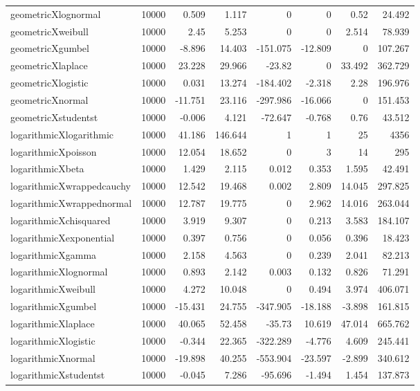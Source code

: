 \begin{table}[!htbp]
{\begin{tabular}{lrrrrrrr}
geometricXlognormal & 10000 & 0.509 & 1.117 & 0 & 0 & 0.52 & 24.492 \\ 
geometricXweibull & 10000 & 2.45 & 5.253 & 0 & 0 & 2.514 & 78.939 \\ 
geometricXgumbel & 10000 & -8.896 & 14.403 & -151.075 & -12.809 & 0 & 107.267 \\ 
geometricXlaplace & 10000 & 23.228 & 29.966 & -23.82 & 0 & 33.492 & 362.729 \\ 
geometricXlogistic & 10000 & 0.031 & 13.274 & -184.402 & -2.318 & 2.28 & 196.976 \\ 
geometricXnormal & 10000 & -11.751 & 23.116 & -297.986 & -16.066 & 0 & 151.453 \\ 
geometricXstudentst & 10000 & -0.006 & 4.121 & -72.647 & -0.768 & 0.76 & 43.512 \\ 
logarithmicXlogarithmic & 10000 & 41.186 & 146.644 & 1 & 1 & 25 & 4356 \\ 
logarithmicXpoisson & 10000 & 12.054 & 18.652 & 0 & 3 & 14 & 295 \\ 
logarithmicXbeta & 10000 & 1.429 & 2.115 & 0.012 & 0.353 & 1.595 & 42.491 \\ 
logarithmicXwrappedcauchy & 10000 & 12.542 & 19.468 & 0.002 & 2.809 & 14.045 & 297.825 \\ 
logarithmicXwrappednormal & 10000 & 12.787 & 19.775 & 0 & 2.962 & 14.016 & 263.044 \\ 
logarithmicXchisquared & 10000 & 3.919 & 9.307 & 0 & 0.213 & 3.583 & 184.107 \\ 
logarithmicXexponential & 10000 & 0.397 & 0.756 & 0 & 0.056 & 0.396 & 18.423 \\ 
logarithmicXgamma & 10000 & 2.158 & 4.563 & 0 & 0.239 & 2.041 & 82.213 \\ 
logarithmicXlognormal & 10000 & 0.893 & 2.142 & 0.003 & 0.132 & 0.826 & 71.291 \\ 
logarithmicXweibull & 10000 & 4.272 & 10.048 & 0 & 0.494 & 3.974 & 406.071 \\ 
logarithmicXgumbel & 10000 & -15.431 & 24.755 & -347.905 & -18.188 & -3.898 & 161.815 \\ 
logarithmicXlaplace & 10000 & 40.065 & 52.458 & -35.73 & 10.619 & 47.014 & 665.762 \\ 
logarithmicXlogistic & 10000 & -0.344 & 22.365 & -322.289 & -4.776 & 4.609 & 245.441 \\ 
logarithmicXnormal & 10000 & -19.898 & 40.255 & -553.904 & -23.597 & -2.899 & 340.612 \\ 
logarithmicXstudentst & 10000 & -0.045 & 7.286 & -95.696 & -1.494 & 1.454 & 137.873 \\ 

\end{tabular}}
\end{table}
